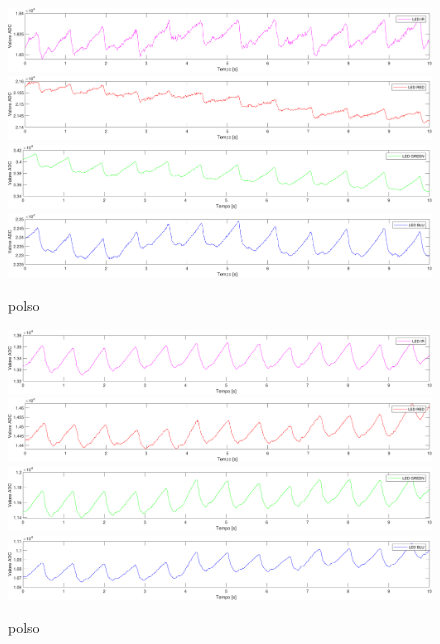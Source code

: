 \begin{figure}[tbh]
	\centering
	\includegraphics[width=0.8\linewidth]{ImageFiles/Misure Preliminari/Soggetto 1/polpastrello_ired}
	\includegraphics[width=0.8\linewidth]{ImageFiles/Misure Preliminari/Soggetto 1/polpastrello_red}
	\includegraphics[width=0.8\linewidth]{ImageFiles/Misure Preliminari/Soggetto 1/polpastrello_green}
	\includegraphics[width=0.8\linewidth]{ImageFiles/Misure Preliminari/Soggetto 1/polpastrello_blu}
	\caption{polso}
	\label{fig:Descrizione_Segnale_PPG}
\end{figure}

\begin{figure}[tbh]
	\centering
	\includegraphics[width=0.8\linewidth]{ImageFiles/Misure Preliminari/Soggetto 1/lobo_ired}
	\includegraphics[width=0.8\linewidth]{ImageFiles/Misure Preliminari/Soggetto 1/lobo_red}
	\includegraphics[width=0.8\linewidth]{ImageFiles/Misure Preliminari/Soggetto 1/lobo_green}
	\includegraphics[width=0.8\linewidth]{ImageFiles/Misure Preliminari/Soggetto 1/lobo_blu}
	\caption{polso}
	\label{fig:Descrizione_Segnale_PPG}
\end{figure}

